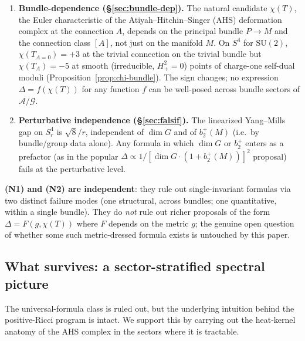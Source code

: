 \documentclass[11pt,letterpaper]{article}
\theoremstyle{definition}
\newcommand{\cA}{\mathcal{A}}
\newcommand{\cG}{\mathcal{G}}
\begin{document}
\begin{enumerate}[label=\textbf{(N\arabic*)},leftmargin=2.8em]
\item \textbf{Bundle-dependence (\S\ref{sec:bundle-dep}).} The natural candidate $\chi(T)$, the Euler characteristic of the Atiyah--Hitchin--Singer (AHS) deformation complex at the connection $A$, depends on the principal bundle $P \to M$ and the connection class $[A]$, not just on the manifold $M$. On $S^4$ for $\mathrm{SU}(2)$, $\chi(T_{A=0}) = +3$ at the trivial connection on the trivial bundle but $\chi(T_A) = -5$ at smooth (irreducible, $H^2_+ = 0$) points of charge-one self-dual moduli (Proposition~\ref{prop:chi-bundle}). The sign changes; no expression $\Delta = f(\chi(T))$ for any function $f$ can be well-posed across bundle sectors of $\cA/\cG$.

\item \textbf{Perturbative independence (\S\ref{sec:falsif}).} The linearized Yang--Mills gap on $S^4_r$ is $\sqrt{8}/r$, independent of $\dim G$ and of $b_2^+(M)$ (i.e.\ by bundle/group data alone). Any formula in which $\dim G$ or $b_2^+$ enters as a prefactor (as in the popular $\Delta \propto 1/[\dim G \cdot (1 + b_2^+(M))]^2$ proposal) fails at the perturbative level.
\end{enumerate}

\textbf{(N1) and (N2) are independent}: they rule out single-invariant formulas via two distinct failure modes (one structural, across bundles; one quantitative, within a single bundle). They do \emph{not} rule out richer proposals of the form $\Delta = F(g, \chi(T))$ where $F$ depends on the metric $g$; the genuine open question of whether some such metric-dressed formula exists is untouched by this paper.

\subsection{What survives: a sector-stratified spectral picture}

The universal-formula class is ruled out, but the underlying intuition behind the positive-Ricci program is intact. We support this by carrying out the heat-kernel anatomy of the AHS complex in the sectors where it is tractable.
\end{document}
